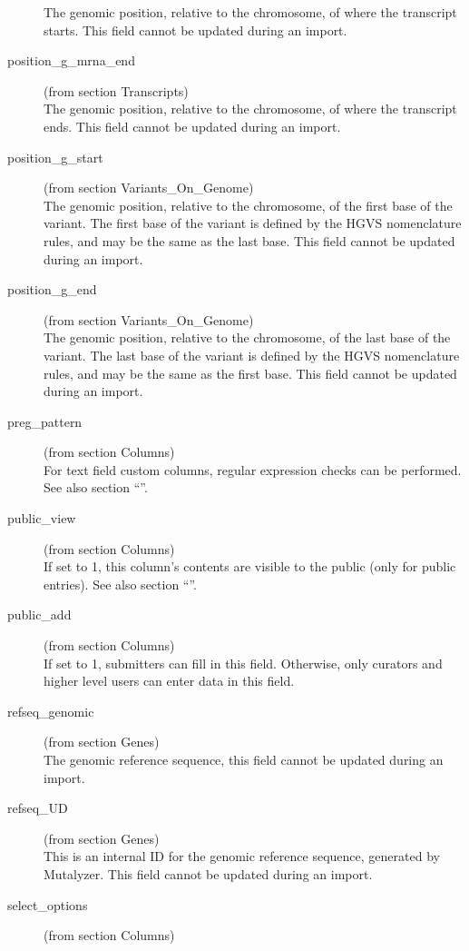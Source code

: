 \begin{description}
  The genomic position, relative to the chromosome, of where the transcript starts.
  This field cannot be updated during an import.
  \item[position\_g\_mrna\_end] (from section Transcripts)\hfill \\
  The genomic position, relative to the chromosome, of where the transcript ends.
  This field cannot be updated during an import.
  \item[position\_g\_start] (from section Variants\_On\_Genome)\hfill \\
  The genomic position, relative to the chromosome, of the first base of the variant.
  The first base of the variant is defined by the HGVS nomenclature rules, and may be the same as the last base.
  This field cannot be updated during an import.
  \item[position\_g\_end] (from section Variants\_On\_Genome)\hfill \\
  The genomic position, relative to the chromosome, of the last base of the variant.
  The last base of the variant is defined by the HGVS nomenclature rules, and may be the same as the first base.
  This field cannot be updated during an import.
  \item[preg\_pattern] (from section Columns)\hfill \\
  For text field custom columns, regular expression checks can be performed.
  See also section ``''.
  \item[public\_view] (from section Columns)\hfill \\
  If set to 1, this column's contents are visible to the public (only for public entries).
  See also section ``''.
  \item[public\_add] (from section Columns)\hfill \\
  If set to 1, submitters can fill in this field.
  Otherwise, only curators and higher level users can enter data in this field.
  \item[refseq\_genomic] (from section Genes)\hfill \\
  The genomic reference sequence, this field cannot be updated during an import.
  \item[refseq\_UD] (from section Genes)\hfill \\
  This is an internal ID for the genomic reference sequence, generated by Mutalyzer.
  This field cannot be updated during an import.
  \item[select\_options] (from section Columns)\hfill \\

\end{description}
